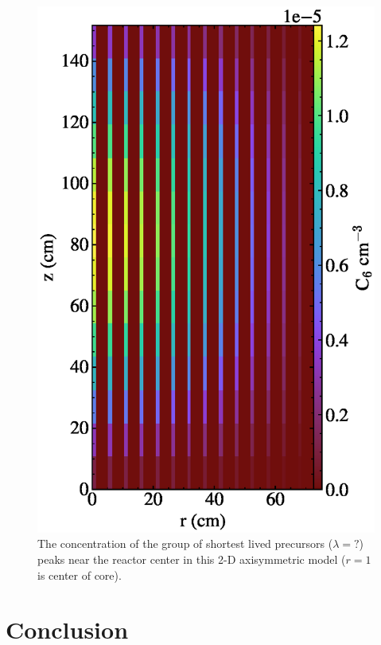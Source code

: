 \documentclass{article}
\let\Oldsection\section
\renewcommand{\section}{\FloatBarrier\Oldsection}
\begin{document}
\begin{figure}
  \centering
  \includegraphics{auto_diff_rho_pre6.eps}
        \caption{The concentration of the group of shortest lived precursors 
        ($\lambda = ?$) peaks near the reactor center
        in this 2-D axisymmetric model ($r=1$ is center of core).}
  \label{fig:pre6}
\end{figure}

\section{Conclusion}
\end{document}
